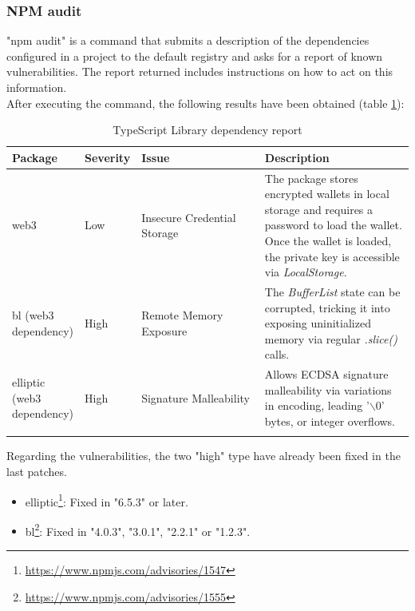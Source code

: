 \documentclass[a4paper, 12pt]{article} %
\begin{document}
            \subsubsection{NPM audit}
                "\acrshort{npm} audit" is a command that submits a description of the dependencies configured in a project to the default registry and asks for a report of known vulnerabilities. The report returned includes instructions on how to act on this information.\\
                
                After executing the command, the following results have been obtained (table \ref{tab:depen}):
                \begin{longtable}{||p{0.11\linewidth} | p{0.11\linewidth} | p{0.35\linewidth} | p{0.43\linewidth}||}
                    \hline
                    \textbf{Package} & \textbf{Severity} & \textbf{Issue} & \textbf{Description} \\ [0.5ex] 
                    \hline\hline
                    web3 & Low &  Insecure Credential Storage  & The package stores encrypted wallets in local storage and requires a password to load the wallet. Once the wallet is loaded, the private key is accessible via \textit{LocalStorage}.\\
                    \hline
                    bl (web3 dependency) & High &  Remote Memory Exposure & The \textit{BufferList} state can be corrupted, tricking it into exposing uninitialized memory via regular \textit{.slice()} calls.\\
                    \hline
                    elliptic (web3 dependency) & High &  Signature Malleability  & Allows ECDSA signature malleability via variations in encoding, leading '$\backslash$0' bytes, or integer overflows. \\
                    \hline
                    \caption{TypeScript Library dependency report}
                    \label{tab:depen}
                \end{longtable}
                
                Regarding the vulnerabilities, the two "high" type have already been fixed in the last patches.
                \begin{itemize}
                    \item elliptic\footnote{\url{https://www.npmjs.com/advisories/1547}}: Fixed in "6.5.3" or later.
                    \item bl\footnote{\url{https://www.npmjs.com/advisories/1555}}: Fixed in "4.0.3", "3.0.1", "2.2.1" or "1.2.3".
                \end{itemize}
                
\end{document}
